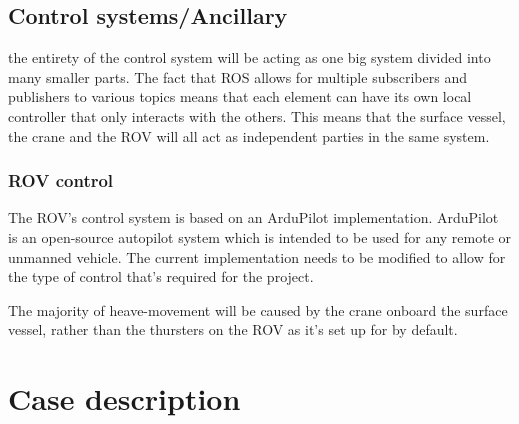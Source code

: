 \documentclass[class=article, crop=false]{standalone}
\begin{document}
\subsection{Control systems/Ancillary}
the entirety of the control system will be acting as one big system divided into many smaller parts. The fact that ROS allows for multiple subscribers and publishers to various topics means that each element can have its own local controller that only interacts with the others. This means that the surface vessel, the crane and the ROV will all act as independent parties in the same system.
\subsubsection{ROV control}
The ROV's control system is based on an ArduPilot implementation. ArduPilot is an open-source autopilot system which is intended to be used for any remote or unmanned vehicle. The current implementation needs to be modified to allow for the type of control that's required for the project.

The majority of heave-movement will be caused by the crane onboard the surface vessel, rather than the thursters on the ROV as it's set up for by default.
\section{Case description}
\end{document}
